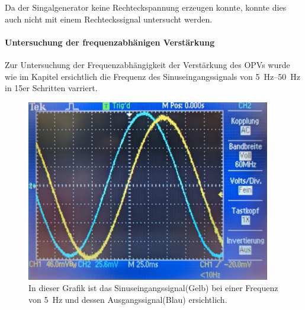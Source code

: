 \documentclass[12pt,english,ngerman]{scrartcl}
\begin{document}
Da der Singalgenerator \cite{funktionsgenerator} keine Rechteckspannung erzeugen konnte, konnte
dies auch nicht mit einem Rechteckssignal untersucht werden.


\paragraph{Untersuchung der frequenzabhänigen Verstärkung}
Zur Untersuchung der Frequenzabhängigkeit der Verstärkung des OPVs wurde wie im
Kapitel  ersichtlich die Frequenz des
Sinuseingangssignals von \SIrange{5}{50}{\hertz} in 15er Schritten varriert.

\begin{figure}[H]
  \centering
    \includegraphics[width=0.95\textwidth]{./figures/integrator/5hz.jpg}
    \caption{In dieser Grafik ist das Sinuseingangssignal(Gelb) bei einer Frequenz von
    \SI{5}{\Hz} und dessen Ausgangssignal(Blau) ersichtlich.}
  \label{fig:mess_integrator_5hz}
\end{figure}
\end{document}
